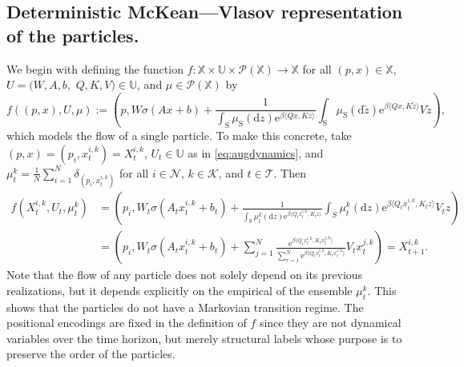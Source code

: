 \documentclass[11pt]{article}
\newcommand{\XX}{\mathbb{X}}
\newcommand{\UU}{\mathbb{U}}
\newcommand{\cK}{\mathcal{K}}
\newcommand{\cN}{\mathcal{N}}
\newcommand{\cP}{\mathcal{P}}
\newcommand{\cT}{\mathcal{T}}
\newcommand{\inner}[2]{\langle#1, #2\rangle}
\newcommand{\e}{\mathrm{e}} %
\newcommand{\de}{\mathrm{d}} %
\begin{document}
\subsection{Deterministic McKean---Vlasov representation of the particles.} We begin with defining the function $f:\XX\times\UU\times\cP(\XX)\to\XX$ for all $(p,x)\in\XX$, $U = (W, A, b,$ $ Q, K, V) \in\UU$, and $\mu\in\cP(\XX)$ by
\begin{equation}\label{eq:McKean---Vlasov}
    f((p, x), U, \mu) := \left(p,  W\sigma(Ax + b) + \dfrac{1}{\int_\mathrm{S} \mu_\mathrm{S}(\de z) \e^{\beta\inner{Qx}{Kz}}}\int_\mathrm{S} \mu_\mathrm{S}(\de \tilde{z}) \e^{\beta\inner{Qx}{K\tilde{z}}}V\tilde{z}\right),
\end{equation}
which models the flow of a single particle. To make this concrete, take $(p,x) = (p_i, x_t^{i,k}) = X_t^{i,k}$, $U_t\in\UU$ as in \eqref{eq:augdynamics}, and $\mu_t^k = \frac{1}{N}\sum_{i=1}^N\delta_{(p_i,x_t^{i,k})}$ for all $i\in\cN$, $k\in\cK$, and $t\in\cT$. Then 
\begin{align*}
    f(X_t^{i,k}, U_t, \mu_t^k) &= \left(p_i, W_t\sigma(A_tx_t^{i,k} + b_t) + \frac{1}{\int_\mathrm{S}\mu_t^k(\de z)\e^{\beta\langle Q_tx_t^{i,k}, K_tz\rangle}}\int_S\mu_t^k(\de z)\e^{\beta\langle Q_tx_t^{i,k}, K_tz\rangle}V_tz\right)\\
    &= \left(p_i,  W_t\sigma(A_tx_t^{i,k} + b_t) + \sum_{j=1}^N \frac{ \e^{\beta\inner{Q_tx_t^{i,k}}{K_tx_t^{j,k}}}}{\sum_{r=1}^N\e^{\beta\inner{Q_tx_t^{i,k}}{K_tx_t^{r,k}}}}V_tx_t^{j,k}\right) = X_{t+1}^{i,k}.
\end{align*}
Note that the flow of any particle does not solely depend on its previous realizations, but it depends explicitly on the empirical of the ensemble $\mu_t^k$. This shows that the particles do not have a Markovian transition regime. The positional encodings are fixed in the definition of $f$ since they are not dynamical variables over the time horizon, but merely structural labels whose purpose is to preserve the order of the particles.
\end{document}
